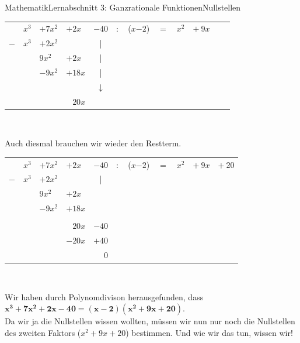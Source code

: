 \documentclass[11pt,twocolumn,oneside,openany,headings=optiontotoc,11pt,numbers=noenddot]{article}
\begin{document}
\begin{worksheet}{Mathematik}{Lernabschnitt 3: Ganzrationale Funktionen}{Nullstellen}
\begin{tabularx}{0.5\textwidth}{rlllllllllll}
			& \(x^3\) & \(+\)\(7x^2\) & \(+\)\(2x\) & \(-\)\(40\) & \(:\) & (\colorbox{green!10}{\(x\)}\(-\)\(2\)) & \(=\) & \(x^2\) & \(+\ \)\(9x\)& \\
			\(-\) & \(x^3\) & \( +\)\(2x^2\) & & \multicolumn{1}{c}{|}\\
			\cline{1-3}
			& & \(9x^2\) & \(+\)\( 2x\) & \multicolumn{1}{c}{|}\\
			& & \(-\)\(9x^2\) & \(+18x\) & \multicolumn{1}{c}{|}\\
			\cline{3-4}
			& & & & \multicolumn{1}{c}{\(\downarrow\)}\\
			& & & \multicolumn{1}{r}{\colorbox{green!10}{\(20x\)}} & \\
		\end{tabularx}\\
		\par\noindent
		Auch diesmal brauchen wir wieder den Restterm.\\
		\par\noindent
		\begin{tabularx}{0.5\textwidth}{rlllllll|lll|}
			\cline{9-11}
			& \(x^3\) & \(+\)\(7x^2\) & \(+\)\(2x\) & \(-\)\(40\) & \(:\) & (\colorbox{green!10}{\(x\)}\(-\)\(2\)) & \(=\) & \(x^2\) & \(+\ \)\(9x\)& \(+\ \)\underline{\(20\)}\\
			\cline{9-11}
			\(-\) & \(x^3\) & \( +\)\(2x^2\) & & \multicolumn{1}{c}{|}\\
			\cline{1-3}
			& & \(9x^2\) & \(+\)\( 2x\) & \\
			& & \(-\)\(9x^2\) & \(+18x\) & \\
			\cline{3-4}\\
			& & & \multicolumn{1}{r}{\colorbox{green!10}{\(20x\)}} & \(-\)\(40\) \\
			& & & \(-\)\(20x\) & \(+\)\(40\) \\
			\cline{4-5}
			& & & & \multicolumn{1}{r}{\(0\)}
		\end{tabularx}\\
		\par\noindent
		Wir haben durch Polynomdivison herausgefunden, dass \(\mathbf{x^3+7x^2+2x-40=(x-2)(x^2+9x+20)}\).\\
		Da wir ja die Nullstellen wissen wollten, müssen wir nun nur noch die Nullstellen des zweiten Faktors (\(x^2+9x+20\)) bestimmen. Und wie wir das tun, wissen wir!
	\end{worksheet}
\end{document}
